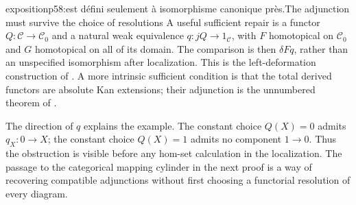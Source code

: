 \begin{dcomment}{exposition}{p58:est défini seulement à isomorphisme canonique près.}{The adjunction must survive the choice of resolutions}
A useful sufficient repair is a functor $Q:\mathcal C\to\mathcal C_0$ and a natural weak equivalence $q:jQ\to1_{\mathcal C}$, with $F$ homotopical on $\mathcal C_0$ and $G$ homotopical on all of its domain. The comparison is then $\delta Fq$, rather than an unspecified isomorphism after localization. This is the left-deformation construction of \citet[Theorems~2.2.8 and~2.2.11]{Riehl2014}. A more intrinsic sufficient condition is that the total derived functors are absolute Kan extensions; their adjunction is the unnumbered theorem of \citet{Maltsiniotis2007Adjunction}.

The direction of $q$ explains the example. The constant choice $Q(X)=0$ admits $q_X:0\to X$; the constant choice $Q(X)=1$ admits no component $1\to0$. Thus the obstruction is visible before any hom-set calculation in the localization. The passage to the categorical mapping cylinder in the next proof is a way of recovering compatible adjunctions without first choosing a functorial resolution of every diagram.
\end{dcomment}


